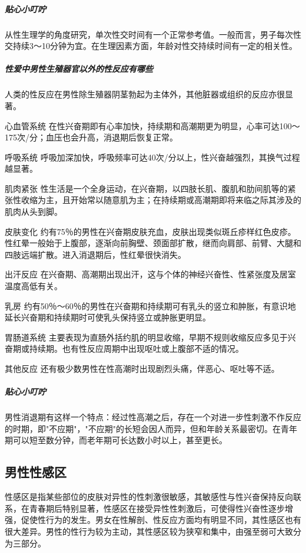 \subparagraph{贴心小叮咛}

从性生理学的角度研究，单次性交时间有一个正常参考值。一般而言，男子每次性交持续3～10分钟为宜。在生理因素方面，年龄对性交持续时间有一定的相关性。

\subparagraph{性爱中男性生殖器官以外的性反应有哪些}

人类的性反应在男性除生殖器阴茎勃起为主体外，其他脏器或组织的反应亦很显著。

心血管系统
在性兴奋期即有心率加快，持续期和高潮期更为明显，心率可达100～175次/分；血压也会升高，消退期后恢复正常。

呼吸系统
呼吸加深加快，呼吸频率可达40次/分以上，性兴奋越强烈，其换气过程越显著。

肌肉紧张
性生活是一个全身运动，在兴奋期，以四肢长肌、腹肌和肋间肌等的紧张性收缩为主，且开始常以随意肌为主；在持续期或高潮期即将来临之际其涉及的肌肉从头到脚。

皮肤变化
约有75％的男性在兴奋期皮肤充血，皮肤出现类似斑丘疹样红色皮疹。性红晕一般始于上腹部，逐渐向前胸壁、颈面部扩散，继而向肩部、前臂、大腿和四肢远端扩散。进入消退期后，性红晕很快消失。

出汗反应
在兴奋期、高潮期出现出汗，这与个体的神经兴奋性、性紧张度及居室温度高低有关。

乳房
约有50％～60％的男性在兴奋期和持续期可有乳头的竖立和肿胀，有意识地延长兴奋期和持续期时可使乳头保持竖立或肿胀更明显。

胃肠道系统
主要表现为直肠外括约肌的明显收缩，早期不规则收缩反应多见于兴奋期或持续期。也有性反应周期中出现呕吐或上腹部不适的情况。

其他反应
还有极少数男性在性高潮时出现剧烈头痛，伴恶心、呕吐等不适。

\subparagraph{贴心小叮咛}

男性消退期有这样一个特点：经过性高潮之后，存在一个对进一步性刺激不作反应的时期，即"不应期"，"不应期"的长短会因人而异，但和年龄关系最密切。在青年期可以短至数分钟，而老年期可长达数小时以上，甚至更长。

\subsection{男性性感区}

性感区是指某些部位的皮肤对异性的性刺激很敏感，其敏感性与性兴奋保持反向联系，在青春期后特别显著，性感区在接受异性性刺激后，可使得性兴奋性逐步增强，促使性行为的发生。男女在性解剖、性反应方面均有明显不同，其性感区也有很大差异。男性的性行为较为主动，其性感区较为狭窄和集中，由强至弱可大致分为三部分。

